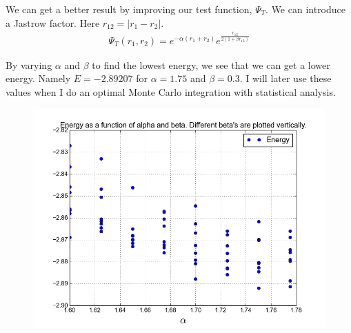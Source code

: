 \documentclass[a4paper, 12pt, titlepage]{article}
\begin{document}
 We can get a better result by improving our test function, $\Psi_T$. We can introduce a Jastrow factor. Here $r_{12} = |r_1 - r_2|$. 
 \begin{align*}
 	\Psi_T(r_1,r_2) = e^{-\alpha(r_1 + r_2)}e^{\frac{r_{12}}{2(1+\beta r_{12})}}
 \end{align*}
 
 By varying $\alpha$ and $\beta$ to find the lowest energy, we see that we can get a lower energy. Namely $E = -2.89207$ for $\alpha = 1.75$ and $\beta = 0.3$. I will later use these values when I do an optimal Monte Carlo integration with statistical analysis.

 \begin{figure}[H]
 	\centering
 	\includegraphics[width=\textwidth]{../python_programs/EnergyVariance_helium5.png}
 \end{figure}
\end{document}
